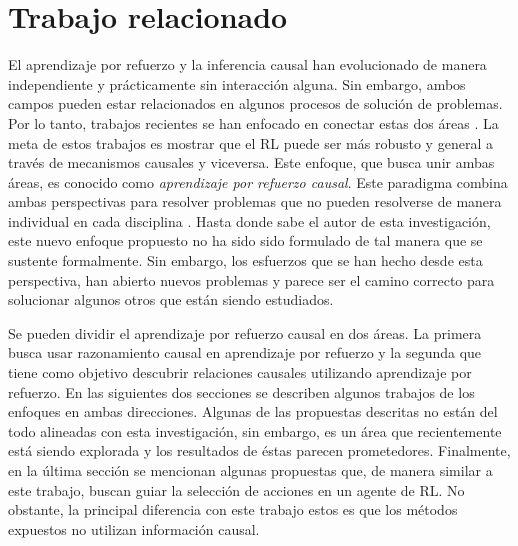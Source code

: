 \chapter{Trabajo relacionado}\label{chapter3}

\graphicspath{{Chapter3/Figs/}}


El aprendizaje por refuerzo y la inferencia
causal han evolucionado de manera 
independiente y prácticamente sin 
interacción alguna. Sin embargo, ambos campos
pueden estar relacionados en algunos
procesos de solución de problemas.
Por lo tanto, trabajos recientes
se han enfocado en conectar estas dos
áreas \cite{Gershman2017, 6-DBLP:journals/midm/YuDLR19, lu2018deconfounding, dasgupta2019causal}. La meta de estos trabajos es mostrar que el RL puede ser más robusto y general a través de mecanismos
causales y viceversa.
Este enfoque, que busca unir ambas áreas, es conocido como
\textit{aprendizaje por refuerzo causal}. Este paradigma combina
ambas perspectivas para resolver problemas que no pueden
resolverse de manera individual en cada disciplina \cite{CausalRL2019EliasB, chaochao_2019}.
Hasta donde sabe el autor de esta investigación, este nuevo enfoque propuesto no ha sido sido formulado de tal manera que se sustente formalmente.
Sin embargo, los esfuerzos que se han hecho desde esta perspectiva, han abierto
nuevos problemas y parece ser el camino correcto para solucionar algunos otros
que están siendo estudiados.


Se pueden dividir el aprendizaje por refuerzo causal
en dos áreas. La primera busca usar razonamiento causal en aprendizaje por refuerzo y la segunda que tiene como objetivo descubrir relaciones causales utilizando aprendizaje por refuerzo. En las siguientes dos secciones se describen
algunos trabajos de los enfoques en ambas direcciones. Algunas de las
propuestas descritas no están del todo alineadas con esta investigación, sin embargo, es un área que recientemente está siendo explorada y los resultados de éstas parecen prometedores.
Finalmente, en la última sección se mencionan algunas propuestas que, de manera similar a este trabajo, buscan guiar la selección de acciones en un agente de RL. No obstante, la principal diferencia con este trabajo estos es que los métodos expuestos no utilizan información causal.


